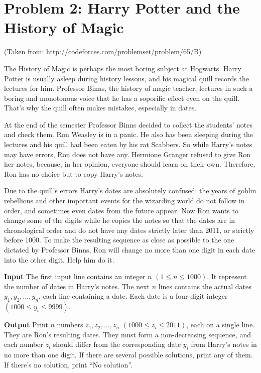 \normalfont\documentclass[letterpaper,11pt]{article}
\begin{document}
\newpage

\section*{Problem 2: Harry Potter and the History of Magic}
(Taken from: http://codeforces.com/problemset/problem/65/B)

The History of Magic is perhaps the most boring subject at Hogwarts. Harry Potter is usually asleep during history lessons, and his magical quill records the lectures for him. Professor Binns, the history of magic teacher, lectures in such a boring and monotonous voice that he has a soporific effect even on the quill. That's why the quill often makes mistakes, especially in dates.

At the end of the semester Professor Binns decided to collect the students' notes and check them. Ron Weasley is in a panic. He also has been sleeping during the lectures and his quill had been eaten by his rat Scabbers. So while Harry's notes may have errors, Ron does not have any. Hermione Granger refused to give Ron her notes, because, in her opinion, everyone should learn on their own. Therefore, Ron has no choice but to copy Harry's notes.

Due to the quill's errors Harry's dates are absolutely confused: the years of goblin rebellions and other important events for the wizarding world do not follow in order, and sometimes even dates from the future appear. Now Ron wants to change some of the digits while he copies the notes so that the dates are in chronological order and do not have any dates strictly later than 2011, or strictly before 1000. To make the resulting sequence as close as possible to the one dictated by Professor Binns, Ron will change no more than one digit in each date into the other digit. Help him do it.

\textbf{Input} \newline
The first input line contains an integer $n$ $(1 \leq n \leq 1000)$. It represent the number of dates in Harry's notes. The next $n$ lines contains the actual dates $y_1, y_2, \ldots, y_n$, each line containing a date. Each date is a four-digit integer $(1000 \leq y_i \leq 9999)$.

\textbf{Output} \newline
Print $n$ numbers $z_1, z_2, \ldots, z_n$ $(1000 \leq z_i \leq 2011)$, each on a single line. They are Ron's resulting dates. They must form a non-decreasing sequence, and each number $z_i$ should differ from the corresponding date $y_i$ from Harry's notes in no more than one digit. If there are several possible solutions, print any of them. If there's no solution, print ``No solution''.
\end{document}
